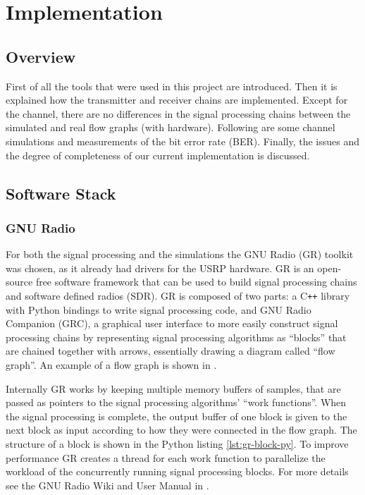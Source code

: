 
\chapter{Implementation} \label{chp:implementation}

\section{Overview}

First of all the tools that were used in this project are introduced. Then it is explained how the transmitter and receiver chains are implemented. Except for the channel, there are no differences in the signal processing chains between the simulated and real flow graphs (with hardware). Following are some channel simulations and measurements of the bit error rate (BER). Finally, the issues and the degree of completeness of our current implementation is discussed.

\section{Software Stack}

\subsection{GNU Radio}

For both the signal processing and the simulations the GNU Radio (GR) toolkit was chosen, as it already had drivers for the USRP hardware. GR is an open-source free software framework that can be used to build signal processing chains and software defined radios (SDR). GR is composed of two parts: a C\texttt{++} library with Python bindings to write signal processing code, and GNU Radio Companion (GRC), a graphical user interface to more easily construct signal processing chains by representing signal processing algorithms as ``blocks'' that are chained together with arrows, essentially drawing a diagram called ``flow graph''. An example of a flow graph is shown in .

Internally GR works by keeping multiple memory buffers of samples, that are passed as pointers to the signal processing algorithms' ``work functions''. When the signal processing is complete, the output buffer of one block is given to the next block as input according to how they were connected in the flow graph. The structure of a block is shown in the Python listing \ref{lst:gr-block-py}. To improve performance GR creates a thread for each work function to parallelize the workload of the concurrently running signal processing blocks. For more details see the GNU Radio Wiki and User Manual in \cite{GRWiki}.

